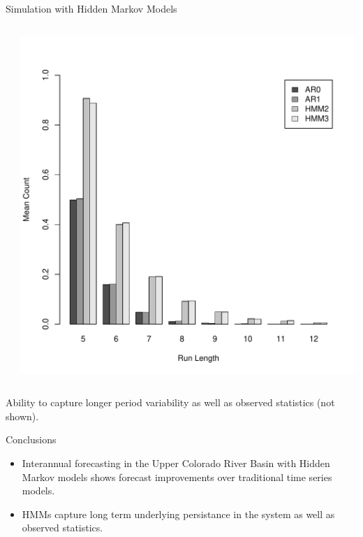 \documentclass[final,x11names]{beamer}
\begin{document}
\begin{frame}{}
\begin{columns}
\begin{column}{.33\linewidth}
\begin{block}{Simulation with Hidden Markov Models}
\begin{columns}
\begin{column}{.48\textwidth}
			\end{column}
			\begin{column}{.48\textwidth}
				\centerline{\includegraphics[width=\textwidth]{figs/sim-lengths-mean.pdf}}
			\end{column}
		\end{columns}
		Ability to capture longer period variability as well as observed statistics (not shown).
		\end{block}
		
        \begin{block}{Conclusions}
        	
			\begin{itemize}
				\item Interannual forecasting in the Upper Colorado River Basin with Hidden 
				    Markov models shows forecast improvements over traditional time series 
				    models. 	
				\item HMMs capture long term underlying persistance in the system as well as 
					observed statistics.
			\end{itemize}
        
        \end{block}
        
        

\end{column}
\end{columns}
\end{frame}
\end{document}
